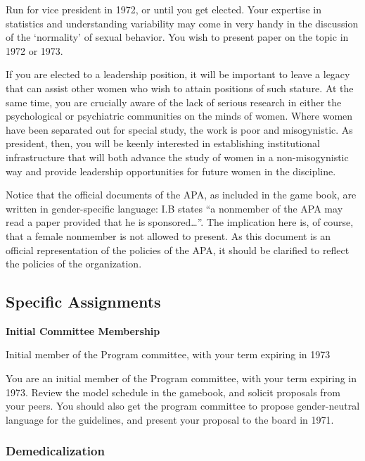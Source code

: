 \begin{refsection}
Run for vice president in 1972, or until you get elected. Your expertise in statistics and understanding variability may come in very handy in the discussion of the `normality' of sexual behavior. You wish to present paper on the topic in 1972 or 1973.

If you are elected to a leadership position, it will be important to leave a legacy that can assist other women who wish to attain positions of such stature. At the same time, you are crucially aware of the lack of serious research in either the psychological or psychiatric communities on the minds of women. Where women have been separated out for special study, the work is poor and misogynistic. As president, then, you will be keenly interested in establishing institutional infrastructure that will both advance the study of women in a non-misogynistic way and provide leadership opportunities for future women in the discipline.

Notice that the official documents of the APA, as included in the game book, are written in gender-specific language: I.B states “a nonmember of the APA may read a paper provided that he is sponsored{\ldots}”. The implication here is, of course, that a female nonmember is not allowed to present. As this document is an official representation of the policies of the APA, it should be clarified to reflect the policies of the organization.

\subsection{Specific Assignments}
\label{specificassignments}

\textbf{Initial Committee Membership}
\begin{service}[Anastasi]\label{service:anastasi}
Initial member of the Program committee, with your term expiring in 1973
\end{service}

You are an initial member of the Program committee, with your term expiring in 1973. Review the model schedule in the gamebook, and solicit proposals from your peers. You should also get the program committee to propose gender-neutral language for the guidelines, and present your proposal to the board in 1971. 

\subsubsection{Demedicalization}
\label{demedicalization}


\end{refsection}
